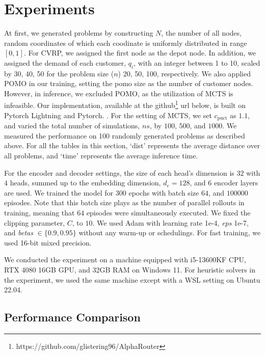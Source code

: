\documentclass{article}
\begin{document}
\section{Experiments}

At first, we generated problems by constructing $N$, the number of all nodes, random coordinates of which each coodinate is uniformly distributed in range $[0, 1]$. For CVRP, we assigned the first node as the depot node. In addition, we assigned the demand of each customer, $q_i$, with an integer between 1 to 10, scaled by 30, 40, 50 for the problem size ($n$) 20, 50, 100, respectively. We also applied POMO \cite{kwonPOMOPolicyOptimization2021} in our training, setting the pomo size as the number of customer nodes. However, in inference, we excluded POMO, as the utilization of MCTS is infeasible. Our implementation, available at the github\footnote{https://github.com/glistering96/AlphaRouter} url below, is built on Pytorch Lightning \cite{pytorchLightning} and Pytorch. \cite{paszke2017automatic}.
For the setting of MCTS, we set $c_{\mbox{puct}}$ as $1.1$, and varied the total number of simulations, $ns$,  by $100$, $500$, and $1000$. We measured the performance on 100 randomly generated problems as described above. For all the tables in this section, `dist' represents the average distance over all problems, and `time' represents the average inference time.


For the encoder and decoder settings, the size of each head's dimension is $32$ with $4$ heads, summed up to the embedding dimension, $d_e=128$, and $6$ encoder layers are used. We trained the model for $300$ epochs with batch size $64$, and $100000$ episodes. Note that this batch size plays as the number of parallel rollouts in training, meaning that $64$ episodes were simultaneously executed. We fixed the clipping parameter, $C$, to $10$. We used Adam \cite{kingma2014adam} with learning rate 1e-4, \textit{eps} 1e-7, and \textit{betas} $\in \{0.9, 0.95\}$ without any warm-up or schedulings. For fast training, we used 16-bit mixed precision.

We conducted the experiment on a machine equipped with i5-13600KF CPU, RTX 4080 16GB GPU, and 32GB RAM on Windows 11. For heuristic solvers in the experiment, we used the same machine except with a WSL setting on Ubuntu 22.04.

\subsection{Performance Comparison}
\end{document}
